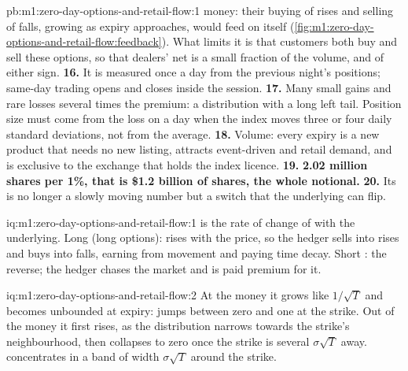 \begin{solution}{pb:m1:zero-day-options-and-retail-flow:1}
money: their buying of rises and selling of falls, growing as expiry
approaches, would feed on itself (\cref{fig:m1:zero-day-options-and-retail-flow:feedback}).
What limits it is that customers both buy and sell these options, so that
dealers' net  is a small fraction of the volume, and of either sign.
\textbf{16.} It is measured once a day from the previous night's positions;
same-day trading opens and closes inside the session.
\textbf{17.} Many small gains and rare losses several times the premium: a
distribution with a long left tail. Position size must come from the loss on
a day when the index moves three or four daily standard deviations, not from
the average.
\textbf{18.} Volume: every expiry is a new product that needs no new
listing, attracts event-driven and retail demand, and is exclusive to the
exchange that holds the index licence.
\textbf{19.} \textbf{2.02 million shares per 1\%, that is \$1.2 billion of
shares, the whole notional.}
\textbf{20.} Its  is no longer a slowly moving number but a switch that
the underlying can flip.
\end{solution}

\begin{solution}{iq:m1:zero-day-options-and-retail-flow:1}
 is the rate of change of  with the underlying. Long  (long
options):  rises with the price, so the hedger sells into rises and
buys into falls, earning from movement and paying time decay. Short :
the reverse; the hedger chases the market and is paid premium for it.
\end{solution}

\begin{solution}{iq:m1:zero-day-options-and-retail-flow:2}
At the money it grows like $1/\sqrt T$ and becomes unbounded at expiry: 
jumps between zero and one at the strike. Out of the money it first rises,
as the distribution narrows towards the strike's neighbourhood, then
collapses to zero once the strike is several $\sigma\sqrt T$ away. 
concentrates in a band of width $\sigma\sqrt T$ around the strike.
\end{solution}

